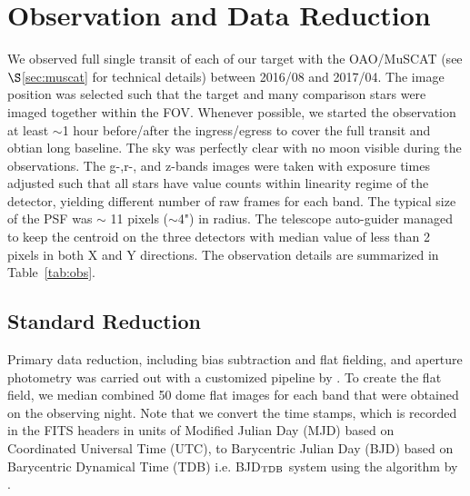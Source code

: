 \chapter{Observation and Data Reduction\label{sec:obs}}
We observed full single transit of each of our target with the OAO/MuSCAT (see $\S$\ref{sec:muscat} for technical details) between 2016/08  and 2017/04. The image position was selected such that the target and many comparison stars were imaged together within the FOV. %
Whenever possible, we started the observation at least $\sim$1 hour before/after the ingress/egress to cover the full transit and obtian long baseline. The sky was perfectly clear with no moon visible during the observations. %
The g-,r-, and z-bands images were taken with exposure times adjusted such that all stars have value counts within linearity regime of the detector, yielding different number of raw frames for each band. The typical size of the PSF was $\sim$ 11 pixels ($\sim$4") in radius.
The telescope auto-guider managed to keep the centroid on the three detectors with %
median value of less than 2 pixels in both X and Y directions. The observation details are summarized in Table~\ref{tab:obs}.

\section{Standard Reduction}
Primary data reduction, including bias subtraction and flat fielding, and aperture photometry was carried out with a customized pipeline by \cite{Fukui2011}. 
To create the flat field, we median combined 50 dome flat images for each band that were obtained on the observing night. Note that we convert the time stamps, which is recorded in the FITS headers in units of Modified Julian Day (MJD) based on Coordinated Universal Time (UTC), to Barycentric Julian Day (BJD) based on Barycentric Dynamical Time (TDB) i.e. BJD$_{\rm{TDB}}$ system using the algorithm by \cite{Eastman2010}. 

